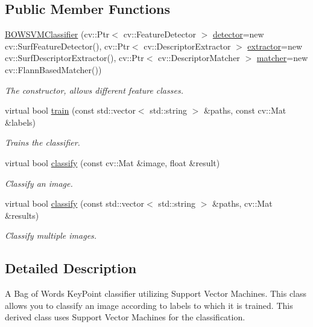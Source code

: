 \subsection*{Public Member Functions}
\begin{DoxyCompactItemize}
\item 
\hyperlink{classBOWSVMClassifier_a9de6c35238e76ca52c2ac01e71d08f16}{BOWSVMClassifier} (cv::Ptr$<$ cv::FeatureDetector $>$ \hyperlink{classBOWClassifier_af98420aa410054ef3010f4c098931a41}{detector}=new cv::SurfFeatureDetector(), cv::Ptr$<$ cv::DescriptorExtractor $>$ \hyperlink{classBOWClassifier_a429b9a83879611a7c3e06eeacec9fb18}{extractor}=new cv::SurfDescriptorExtractor(), cv::Ptr$<$ cv::DescriptorMatcher $>$ \hyperlink{classBOWClassifier_a35057956434d92402d24f2628cfaf35c}{matcher}=new cv::FlannBasedMatcher())
\begin{DoxyCompactList}\small\item\em The constructor, allows different feature classes. \item\end{DoxyCompactList}\item 
virtual bool \hyperlink{classBOWSVMClassifier_a95f08ba073d32d733aa79ae52113c147}{train} (const std::vector$<$ std::string $>$ \&paths, const cv::Mat \&labels)
\begin{DoxyCompactList}\small\item\em Trains the classifier. \item\end{DoxyCompactList}\item 
virtual bool \hyperlink{classBOWSVMClassifier_afe93005b018993deb266193ff942554a}{classify} (const cv::Mat \&image, float \&result)
\begin{DoxyCompactList}\small\item\em Classify an image. \item\end{DoxyCompactList}\item 
virtual bool \hyperlink{classBOWSVMClassifier_a77d77f5172e9665b3ef5154e52db9721}{classify} (const std::vector$<$ std::string $>$ \&paths, cv::Mat \&results)
\begin{DoxyCompactList}\small\item\em Classify multiple images. \item\end{DoxyCompactList}\end{DoxyCompactItemize}


\subsection{Detailed Description}
A Bag of Words KeyPoint classifier utilizing Support Vector Machines. This class allows you to classify an image according to labels to which it is trained. This derived class uses Support Vector Machines for the classification. 

